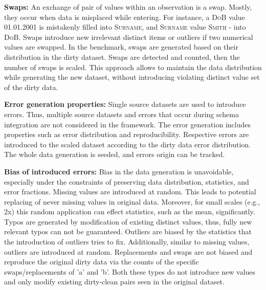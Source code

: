 \textbf{Swaps:} 
An exchange of pair of values within an observation is a swap. 
Mostly, they occur when data is misplaced while entering.
For instance, a \textsc{DoB} value \textsc{01.01.2001} is mistakenly filled into \textsc{Surname}, and \textsc{Surname} value \textsc{Smith} - into \textsc{DoB}.
Swaps introduce new irrelevant distinct items or outliers if two numerical values are swapped.
In the benchmark, swaps are generated based on their distribution in the dirty dataset. Swaps are detected and counted, then the number of swaps is scaled. This approach allows to maintain the data distribution while generating the new dataset, without introducing violating distinct value set of the dirty data.

\textbf{Error generation properties:} 
Single source datasets are used to introduce errors. 
Thus, multiple source datasets and errors that occur during schema integration are not considered in the framework.
The error generation includes properties such as error distribution and reproducibility. Respective errors are introduced to the scaled dataset according to the dirty data error distribution. The whole data generation is seeded, and errors origin can be tracked.


\textbf{Bias of introduced errors:} 
Bias in the data generation is unavoidable, especially under the constraints of preserving data distribution, statistics, and error fractions. 
Missing values are introduced at random. This leads to potential replacing of never missing values in original data.
Moreover, for small scales (e.g., 2x) this random application can effect statistics, such as the mean, significantly.
Typos are generated by modification of existing distinct values, thus, fully new relevant typos can not be guaranteed.
Outliers are biased by the statistics that the introduction of outliers tries to fix.
Additionally, similar to missing values, outliers are introduced at random.
Replacements and swaps are not biased and reproduce the original dirty data via the counts of the specific swaps/replacements of 'a' and 'b'.
Both these types do not introduce new values and only modify existing dirty-clean pairs seen in the original dataset.
